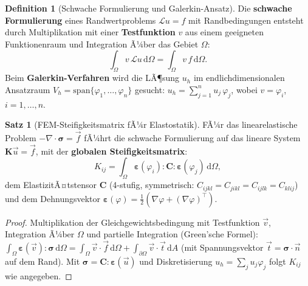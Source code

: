 ﻿\documentclass[a4paper,12pt]{report}
\theoremstyle{definition}
\newtheorem{definition}{Definition}
\newtheorem{satz}{Satz}
\begin{document}
\begin{definition}[Schwache Formulierung und Galerkin-Ansatz]
Die \textbf{schwache Formulierung} eines Randwertproblems
$\mathcal{L}u = f$ mit Randbedingungen entsteht durch Multiplikation
mit einer \textbf{Testfunktion} $v$ aus einem geeigneten Funktionenraum
und Integration Ã¼ber das Gebiet $\Omega$:
\[
  \int_\Omega v\,\mathcal{L}u\,\mathrm{d}\Omega = \int_\Omega v\,f\,\mathrm{d}\Omega.
\]
Beim \textbf{Galerkin-Verfahren} wird die LÃ¶sung $u_h$ im endlichdimensionalen
Ansatzraum $V_h = \mathrm{span}\{\varphi_1,\ldots,\varphi_n\}$ gesucht:
$u_h = \sum_{j=1}^n u_j\,\varphi_j$, wobei $v = \varphi_i$, $i = 1,\ldots,n$.
\end{definition}

\begin{satz}[FEM-Steifigkeitsmatrix fÃ¼r Elastostatik]
FÃ¼r das linearelastische Problem $-\nabla\cdot\boldsymbol{\sigma} = \vec{f}$
fÃ¼hrt die schwache Formulierung auf das lineare System
$\mathbf{K}\vec{u} = \vec{f}$, mit der \textbf{globalen Steifigkeitsmatrix}:
\[
  K_{ij} = \int_\Omega \boldsymbol{\varepsilon}(\varphi_i):\mathbf{C}:\boldsymbol{\varepsilon}(\varphi_j)\,\mathrm{d}\Omega,
\]
dem ElastizitÃ¤tstensor $\mathbf{C}$ (4-stufig, symmetrisch: $C_{ijkl} = C_{jikl} = C_{ijlk} = C_{klij}$)
und dem Dehnungsvektor $\boldsymbol{\varepsilon}(\varphi) = \tfrac{1}{2}(\nabla\varphi + (\nabla\varphi)^\top)$.
\end{satz}
\begin{proof}
Multiplikation der Gleichgewichtsbedingung mit Testfunktion $\vec{v}$,
Integration Ã¼ber $\Omega$ und partielle Integration (Green'sche Formel):
$\int_\Omega\boldsymbol{\varepsilon}(\vec{v}):\boldsymbol{\sigma}\,\mathrm{d}\Omega
= \int_\Omega\vec{v}\cdot\vec{f}\,\mathrm{d}\Omega + \int_{\partial\Omega}\vec{v}\cdot\vec{t}\,\mathrm{d}A$
(mit Spannungsvektor $\vec{t} = \boldsymbol{\sigma}\cdot\vec{n}$ auf dem Rand).
Mit $\boldsymbol{\sigma} = \mathbf{C}:\boldsymbol{\varepsilon}(\vec{u})$ und
Diskretisierung $u_h = \sum_j u_j\varphi_j$ folgt $K_{ij}$ wie angegeben.
\end{proof}
\end{document}
